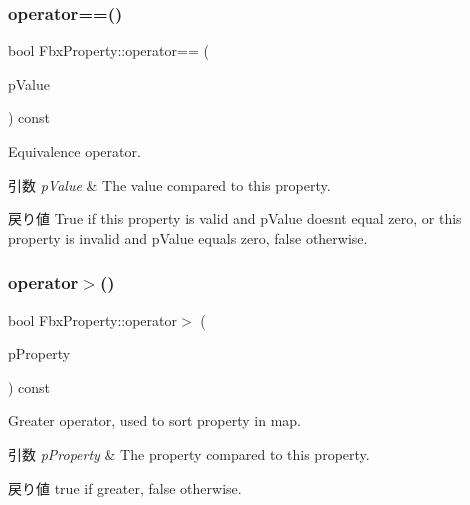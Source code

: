 \subsubsection{\texorpdfstring{operator==()}{operator==()}\hspace{0.1cm}{\footnotesize\ttfamily [2/2]}}
{\footnotesize\ttfamily bool Fbx\+Property\+::operator== (\begin{DoxyParamCaption}\item[{int}]{p\+Value }\end{DoxyParamCaption}) const}

Equivalence operator. 
\begin{DoxyParams}{引数}
{\em p\+Value} & The value compared to this property. \\
\hline
\end{DoxyParams}
\begin{DoxyReturn}{戻り値}
{\ttfamily True} if this property is valid and p\+Value doesn\textquotesingle{}t equal zero, or this property is invalid and p\+Value equals zero, {\ttfamily false} otherwise. 
\end{DoxyReturn}
\mbox{\label{class_fbx_property_a78307c874fd49f1721713da94d953423}} 
\subsubsection{\texorpdfstring{operator$>$()}{operator>()}}
{\footnotesize\ttfamily bool Fbx\+Property\+::operator$>$ (\begin{DoxyParamCaption}\item[{const \hyperlink{class_fbx_property}{Fbx\+Property} \&}]{p\+Property }\end{DoxyParamCaption}) const}

Greater operator, used to sort property in map. 
\begin{DoxyParams}{引数}
{\em p\+Property} & The property compared to this property. \\
\hline
\end{DoxyParams}
\begin{DoxyReturn}{戻り値}
{\ttfamily true} if greater, {\ttfamily false} otherwise. 
\end{DoxyReturn}
\mbox{\label{class_fbx_property_aa652adeb57fa64c60cab63ac1df9efa5}} 
